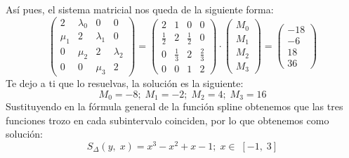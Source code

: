 \documentclass[12pt,a4paper,oneside]{scrbook}
\begin{document}
Así pues, el sistema matricial nos queda de la siguiente forma:
\[
\begin{pmatrix}
    2 & \lambda_0 & 0 & 0\\
\mu_1 & 2  & \lambda_1 & 0\\
    0 & \mu_2  & 2 & \lambda_2\\
    0 &   0    & \mu_3 & 2
\end{pmatrix} =
\begin{pmatrix}
    2 & 1 & 0 & 0\\
 \frac{1}{2} & 2 & \frac{1}{2} & 0\\
       0     & \frac{1}{3} & 2 & \frac{2}{3}\\
    0 & 0 & 1 & 2
\end{pmatrix}\cdot
\begin{pmatrix}
    M_0\\ M_1\\ M_2\\ M_3
\end{pmatrix}=
\begin{pmatrix}
    -18\\ -6\\ 18\\ 36
\end{pmatrix}
\]
Te dejo a ti que lo resuelvas, la solución es la siguiente:
\[
M_0=-8;\; M_1=-2;\;M_2=4;\;M_3=16
\]
Sustituyendo en la fórmula general de la función spline obtenemos que las tres funciones trozo en cada subintervalo coinciden, por lo que obtenemos como solución:
\[
S_\Delta (y,\;x)=x^3-x^2+x-1;\; x\in\; [-1,\; 3]
\]
\end{document}

